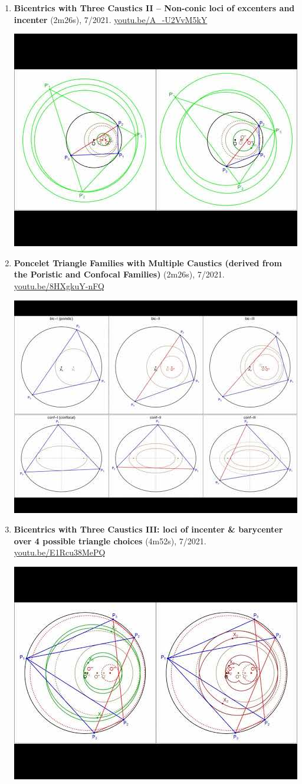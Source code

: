 \documentclass[12pt]{article}
\begin{document}
\begin{enumerate}[resume]
% 
\item \textbf{Bicentrics with Three Caustics II -- Non-conic loci of excenters and  incenter} (2m26s), 7/2021. \href{https://youtu.be/A_-U2VvM5kY}{\url{youtu.be/A\_-U2VvM5kY}}
\begin{center}\includegraphics[width=.5\textwidth]{pics/A_-U2VvM5kY.jpg}\end{center}
% 
\item \textbf{Poncelet Triangle Families with Multiple Caustics (derived from the Poristic and Confocal Families)} (2m26s), 7/2021. \href{https://youtu.be/8HXgkuY-nFQ}{\url{youtu.be/8HXgkuY-nFQ}}
\begin{center}\includegraphics[width=.5\textwidth]{pics/8HXgkuY-nFQ.jpg}\end{center}
% 
\item \textbf{Bicentrics with Three Caustics III: loci of incenter \& barycenter over 4 possible triangle choices} (4m52s), 7/2021. \href{https://youtu.be/E1Rcu38MePQ}{\url{youtu.be/E1Rcu38MePQ}}
\begin{center}\includegraphics[width=.5\textwidth]{pics/E1Rcu38MePQ.jpg}\end{center}

\end{enumerate}
\end{document}
